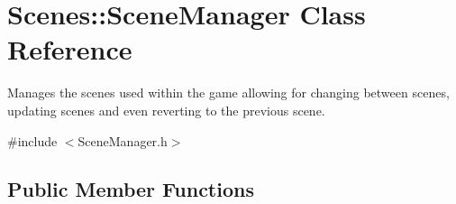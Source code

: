 \hypertarget{class_scenes_1_1_scene_manager}{\section{Scenes\-:\-:Scene\-Manager Class Reference}
\label{class_scenes_1_1_scene_manager}
}


Manages the scenes used within the game allowing for changing between scenes, updating scenes and even reverting to the previous scene.  




{\ttfamily \#include $<$Scene\-Manager.\-h$>$}

\subsection*{Public Member Functions}
